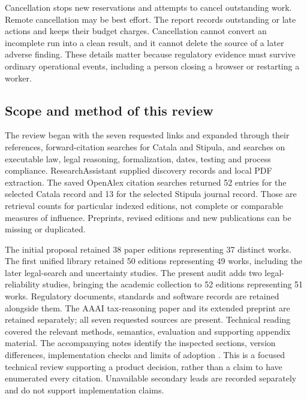 \documentclass[12pt,a4paper,oneside,openany]{book}
\begin{document}
Cancellation stops new reservations and attempts to cancel outstanding work.
Remote cancellation may be best effort. The report records outstanding or late
actions and keeps their budget charges. Cancellation cannot convert an incomplete
run into a clean result, and it cannot delete the source of a later adverse
finding. These details matter because regulatory evidence must survive ordinary
operational events, including a person closing a browser or restarting a worker.


\subsection{Scope and method of this review}
\label{merge:P-02-literature:01}


The review began with the seven requested links and expanded through their
references, forward-citation searches for Catala and Stipula, and searches on
executable law, legal reasoning, formalization, dates, testing and process
compliance. ResearchAssistant supplied discovery records and local PDF extraction.
The saved OpenAlex citation searches returned 52 entries for the selected Catala
record and 13 for the selected Stipula journal record. Those are retrieval counts
for particular indexed editions, not complete or comparable measures of influence.
Preprints, revised editions and new publications can be missing or duplicated.

The initial proposal retained 38 paper editions representing 37 distinct
works. The first unified library retained 50 editions representing 49 works,
including the later legal-search and uncertainty studies. The present
audit adds two legal-reliability studies, bringing the academic collection
to 52 editions representing 51 works. Regulatory documents, standards
and software records are retained alongside them.
The AAAI tax-reasoning paper and its extended preprint are retained separately;
all seven requested sources are present. Technical reading covered the relevant
methods, semantics, evaluation and supporting appendix material. The accompanying
notes identify the inspected sections, version differences, implementation checks
and limits of adoption \citep{libraryreview}. This is a focused technical review
supporting a product decision, rather than a claim to have enumerated every
citation. Unavailable secondary leads are recorded separately and do not support
implementation claims.
\end{document}
